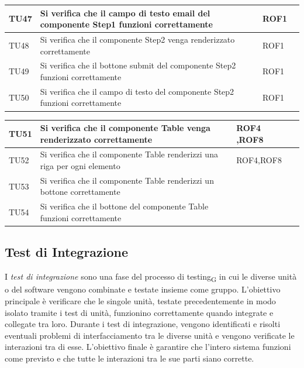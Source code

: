 \documentclass{article}
\begin{document}
\begin{center}
\begin{tabular}{P{5em} P{21em} P{6em} P{6em}}
     TU47 & Si verifica che il campo di testo email del componente Step1 funzioni correttamente   &ROF1  & \\
    \hline
    TU48& Si verifica che il componente Step2 venga renderizzato correttamente &ROF1  & \\
    \hline{}
     TU49 & Si verifica che il bottone submit del componente Step2 funzioni correttamente   & ROF1 & \\
    \hline
    TU50&  Si verifica che il campo di testo del componente Step2 funzioni correttamente&ROF1  & \\
     \end{tabular}
        \end{center}
    \begin{center}
    \begin{tabular}{P{5em} P{21em} P{6em} P{6em}}
     \hline{}
     TU51 & Si verifica che il componente Table venga renderizzato correttamente  &  ROF4 ,ROF8 & \\
    \hline
    TU52& Si verifica che il componente Table renderizzi una riga per ogni elemento  & ROF4,ROF8  & \\
     \hline{}
     TU53 &   Si verifica che il componente Table renderizzi un bottone correttamente &  & \\
     \hline
    TU54& Si verifica che il bottone del componente Table funzioni correttamente  &  & \\
    \hline
    \end{tabular}
\end{center}


\subsection{Test di Integrazione}
I \textit{test di integrazione} sono una fase del processo di testing\textsubscript{G} in cui le diverse unità o del software vengono combinate e testate insieme come gruppo. L'obiettivo principale è verificare che le singole unità, testate precedentemente in modo isolato tramite i test di unità, funzionino correttamente quando integrate e collegate tra loro. Durante i test di integrazione, vengono identificati e risolti eventuali problemi di interfacciamento tra le diverse unità e vengono verificate le interazioni tra di esse. L'obiettivo finale è garantire che l'intero sistema funzioni come previsto e che tutte le interazioni tra le sue parti siano corrette.
\end{document}
